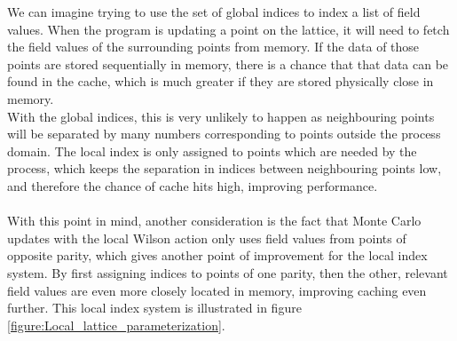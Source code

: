 \documentclass[a4paper,10pt]{book}
\begin{document}
We can imagine trying to use the set of global indices to index a list of field values. When the program is updating a point on the lattice, it will need to fetch the field values of the surrounding points from memory. If the data of those points are stored sequentially in memory, there is a chance that that data can be found in the cache, which is much greater if they are stored physically close in memory.\\With the global indices, this is very unlikely to happen as neighbouring points will be separated by many numbers corresponding to points outside the process domain. The local index is only assigned to points which are needed by the process, which keeps the separation in indices between neighbouring points low, and therefore the chance of cache hits high, improving performance.\\\\With this point in mind, another consideration is the fact that Monte Carlo updates with the local Wilson action only uses field values from points of opposite parity, which gives another point of improvement for the local index system. By first assigning indices to points of one parity, then the other, relevant field values are even more closely located in memory, improving caching even further. This local index system is illustrated in figure \ref{figure:Local_lattice_parameterization}.
\end{document}
